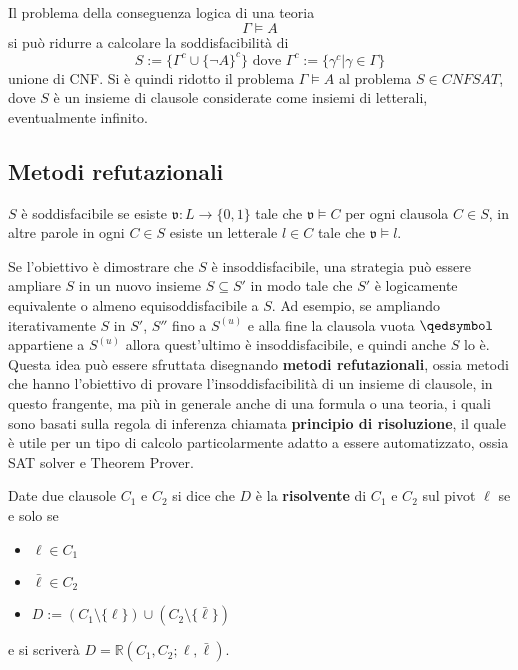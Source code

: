 Il problema della conseguenza logica di una teoria 
$$
\Gamma \models A
$$
si può ridurre a calcolare la soddisfacibilità di 
$$
S := \{\Gamma^c \cup \{\neg A\}^c\} \text{ dove } \Gamma^c := \{\gamma^c | \gamma \in \Gamma\}
$$
unione di CNF. 
Si è quindi ridotto il problema $\Gamma \models A$ al problema $S \in CNFSAT$,
dove $S$ è un insieme di clausole considerate come insiemi di letterali, 
eventualmente infinito. 


\subsection{Metodi refutazionali}
$S$ è soddisfacibile se esiste $\mathfrak{v}:L \rightarrow \{0,1\}$ tale 
che $\mathfrak{v} \models C$ per ogni clausola $C \in S$, in altre parole 
in ogni $C \in S$ esiste un letterale $l \in C$ tale che $\mathfrak{v} \models l$. 

Se l'obiettivo è dimostrare che $S$ è insoddisfacibile, una strategia 
può essere ampliare $S$ in un nuovo insieme $S \subseteq S'$ in modo 
tale che $S'$ è logicamente equivalente o almeno equisoddisfacibile a $S$.
Ad esempio, se ampliando iterativamente $S$ in $S'$, $S''$ fino a $S^{(u)}$ 
e alla fine la clausola vuota $\qedsymbol$ appartiene a $S^{(u)}$ allora quest'ultimo 
è insoddisfacibile, e quindi anche $S$ lo è. Questa idea può essere sfruttata 
disegnando \textbf{metodi refutazionali}, ossia metodi che hanno l'obiettivo di 
provare l'insoddisfacibilità di un insieme di clausole, in questo frangente, 
ma più in generale anche di una formula o una teoria, i quali sono basati 
sulla regola di inferenza chiamata \textbf{principio di risoluzione}, 
il quale è utile per un tipo di calcolo particolarmente adatto a essere automatizzato, 
ossia SAT solver e Theorem Prover. 

\begin{defi}
        Date due clausole $C_1$ e $C_2$ si dice che $D$ è la \textbf{risolvente}
        di $C_1$ e $C_2$ sul pivot $\ell$ se e solo se
        \begin{itemize}
                \item $\ell \in C_1$
                \item $\bar{\ell} \in C_2$
                \item $D := (C_1 \setminus \{\ell\}) \cup (C_2 \setminus \{\bar{\ell}\})$
        \end{itemize}
       e si scriverà $D = \mathbb{R}(C_1,C_2; \ell, \bar{\ell})$. 
\end{defi}

